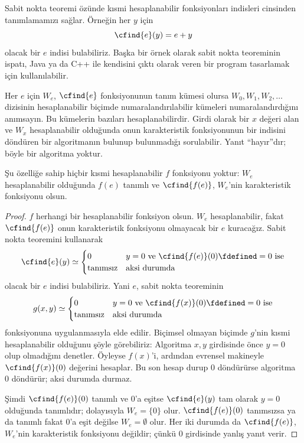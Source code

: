 


Sabit nokta teoremi özünde kısmi hesaplanabilir fonksiyonları indisleri
cinsinden tanımlamamızı sağlar. Örneğin her $y$ için
\[
  \cfind{e}(y)=e+y
\]
olacak bir $e$ indisi bulabiliriz. Başka bir örnek olarak sabit nokta
teoreminin ispatı, Java ya da C++ ile kendisini çıktı olarak veren bir program
tasarlamak için kullanılabilir.

Her $e$ için $W_e$, $\cfind{e}$ fonksiyonunun tanım kümesi olursa
$W_0,W_1,W_2,\dots$ dizisinin hesaplanabilir biçimde numaralandırılabilir
kümeleri numaralandırdığını anımsayın. Bu kümelerin bazıları
hesaplanabilirdir. Girdi olarak bir $x$ değeri alan ve $W_x$ hesaplanabilir
olduğunda onun karakteristik fonksiyonunun bir indisini döndüren bir
algoritmanın bulunup bulunmadığı sorulabilir. Yanıt ``hayır''dır; böyle bir
algoritma yoktur.

\begin{thm}
Şu özelliğe sahip hiçbir kısmi hesaplanabilir $f$ fonksiyonu yoktur:
$W_e$ hesaplanabilir olduğunda $f(e)$ tanımlı ve $\cfind{f(e)}$, $W_e$'nin
karakteristik fonksiyonu olsun.
\end{thm}

\begin{proof}
$f$ herhangi bir hesaplanabilir fonksiyon olsun. $W_e$ hesaplanabilir,
fakat $\cfind{f(e)}$ onun karakteristik fonksiyonu olmayacak bir $e$
kuracağız. Sabit nokta teoremini kullanarak
\[
  \cfind{e}(y)\simeq\begin{cases}
    0 & \text{$y=0$ ve $\cfind{f(e)}(0)\fdefined=0$ ise}\\
    \text{tanımsız} & \text{aksi durumda}
  \end{cases}
\]
olacak bir $e$ indisi bulabiliriz. Yani $e$, sabit nokta teoreminin
\[
  g(x,y)\simeq\begin{cases}
    0 & \text{$y=0$ ve $\cfind{f(x)}(0)\fdefined=0$ ise}\\
    \text{tanımsız} & \text{aksi durumda}
  \end{cases}
\]
fonksiyonuna uygulanmasıyla elde edilir.
Biçimsel olmayan biçimde $g$'nin kısmi hesaplanabilir olduğunu şöyle
görebiliriz: Algoritma $x,y$ girdisinde önce $y=0$ olup olmadığını denetler.
Öyleyse $f(x)$'i, ardından evrensel makineyle $\cfind{f(x)}(0)$ değerini
hesaplar. Bu son hesap durup $0$ döndürürse algoritma $0$ döndürür; aksi
durumda durmaz.

Şimdi $\cfind{f(e)}(0)$ tanımlı ve $0$'a eşitse $\cfind{e}(y)$ tam olarak
$y=0$ olduğunda tanımlıdır; dolayısıyla $W_e=\{0\}$ olur.
$\cfind{f(e)}(0)$ tanımsızsa ya da tanımlı fakat $0$'a eşit değilse
$W_e=\emptyset$ olur. Her iki durumda da $\cfind{f(e)}$, $W_e$'nin
karakteristik fonksiyonu değildir; çünkü $0$ girdisinde yanlış yanıt verir.
\end{proof}


